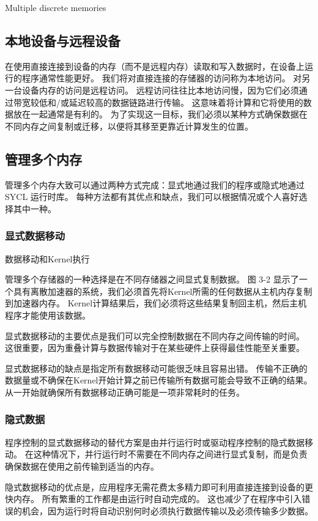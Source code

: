 {\color{red} Multiple discrete memories }

\subsection{本地设备与远程设备}
在使用直接连接到设备的内存（而不是远程内存）读取和写入数据时，在设备上运行的程序通常性能更好。 
我们将对直接连接的存储器的访问称为本地访问。 对另一台设备内存的访问是远程访问。 
远程访问往往比本地访问慢，因为它们必须通过带宽较低和/或延迟较高的数据链路进行传输。 
这意味着将计算和它将使用的数据放在一起通常是有利的。 
为了实现这一目标，我们必须以某种方式确保数据在不同内存之间复制或迁移，以便将其移至更靠近计算发生的位置。

\subsection{管理多个内存}
管理多个内存大致可以通过两种方式完成：显式地通过我们的程序或隐式地通过 SYCL 运行时库。 
每种方法都有其优点和缺点，我们可以根据情况或个人喜好选择其中一种。

\subsubsection{显式数据移动}
{\color{red} 数据移动和Kernel执行 }

管理多个存储器的一种选择是在不同存储器之间显式复制数据。 
图 3-2 显示了一个具有离散加速器的系统，我们必须首先将Kernel所需的任何数据从主机内存复制到加速器内存。 
Kernel计算结果后，我们必须将这些结果复制回主机，然后主机程序才能使用该数据。

显式数据移动的主要优点是我们可以完全控制数据在不同内存之间传输的时间。 
这很重要，因为重叠计算与数据传输对于在某些硬件上获得最佳性能至关重要。

显式数据移动的缺点是指定所有数据移动可能很乏味且容易出错。 
传输不正确的数据量或不确保在Kernel开始计算之前已传输所有数据可能会导致不正确的结果。 
从一开始就确保所有数据移动正确可能是一项非常耗时的任务。

\subsubsection{隐式数据}
程序控制的显式数据移动的替代方案是由并行运行时或驱动程序控制的隐式数据移动。 
在这种情况下，并行运行时不需要在不同内存之间进行显式复制，而是负责确保数据在使用之前传输到适当的内存。

隐式数据移动的优点是，应用程序无需花费太多精力即可利用直接连接到设备的更快内存。 
所有繁重的工作都是由运行时自动完成的。 
这也减少了在程序中引入错误的机会，因为运行时将自动识别何时必须执行数据传输以及必须传输多少数据。

